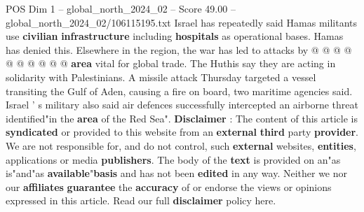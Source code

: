 \begin{textsample}{POS Dim 1 – global\_north\_2024\_02 – Score 49.00 – global\_north\_2024\_02/106115195.txt}
Israel has repeatedly said Hamas militants use \textbf{civilian} \textbf{infrastructure} including \textbf{hospitals} as operational bases.
Hamas has denied this.
Elsewhere in the region, the war has led to attacks by @ @ @ @ @ @ @ @ @ @ \textbf{area} vital for global trade.
The Huthis say they are acting in solidarity with Palestinians.
A missile attack Thursday targeted a vessel transiting the Gulf of Aden, causing a fire on board, two maritime agencies said.
Israel ' s military also said air defences successfully intercepted an airborne threat identified"in the \textbf{area} of the Red Sea". \textbf{Disclaimer} : The content of this article is \textbf{syndicated} or provided to this website from an \textbf{external} \textbf{third} party \textbf{provider}.
We are not responsible for, and do not control, such \textbf{external} websites, \textbf{entities}, applications or media \textbf{publishers}.
The body of the \textbf{text} is provided on an"as is"and"as \textbf{available}"\textbf{basis} and has not been \textbf{edited} in any way.
Neither we nor our \textbf{affiliates} \textbf{guarantee} the \textbf{accuracy} of or endorse the views or opinions expressed in this article.
Read our full \textbf{disclaimer} policy here.

\end{textsample}
